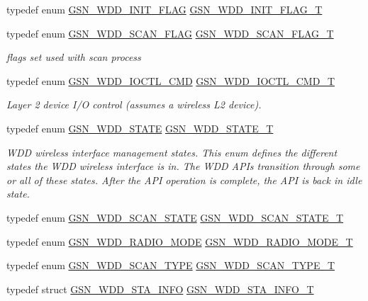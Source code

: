 \begin{DoxyCompactItemize}
typedef enum \hyperlink{a00603_a4ba2b4079f3dd37aa77afda4013afc79}{GSN\_\-WDD\_\-INIT\_\-FLAG} \hyperlink{a00603_ae0e55b26e7cfed5cc849b360e24289e3}{GSN\_\-WDD\_\-INIT\_\-FLAG\_\-T}
\item 
typedef enum \hyperlink{a00677_gaa5a68f88cc724016ff0334f21c0dd120}{GSN\_\-WDD\_\-SCAN\_\-FLAG} \hyperlink{a00677_gad988da580b33f4a18de188de56a05736}{GSN\_\-WDD\_\-SCAN\_\-FLAG\_\-T}
\begin{DoxyCompactList}\small\item\em flags set used with scan process \end{DoxyCompactList}\item 
typedef enum \hyperlink{a00670_gaf67ac3e77c7a5742b9b0bc7672529533}{GSN\_\-WDD\_\-IOCTL\_\-CMD} \hyperlink{a00670_ga0c5055a50e14741ff0accb7d8d5bf039}{GSN\_\-WDD\_\-IOCTL\_\-CMD\_\-T}
\begin{DoxyCompactList}\small\item\em Layer 2 device I/O control (assumes a wireless L2 device). \end{DoxyCompactList}\item 
typedef enum \hyperlink{a00677_ga235b17af49bd1a1dc55715a7809b24ff}{GSN\_\-WDD\_\-STATE} \hyperlink{a00677_ga3a801c5847114c1bb6dc9cc1a0c5837e}{GSN\_\-WDD\_\-STATE\_\-T}
\begin{DoxyCompactList}\small\item\em WDD wireless interface management states. This enum defines the different states the WDD wireless interface is in. The WDD APIs transition through some or all of these states. After the API operation is complete, the API is back in idle state. \end{DoxyCompactList}\item 
typedef enum \hyperlink{a00603_a7504de238040fb5947d3c3ef6fca9ae9}{GSN\_\-WDD\_\-SCAN\_\-STATE} \hyperlink{a00603_a940af0328a2568d0750d618f5c8f141e}{GSN\_\-WDD\_\-SCAN\_\-STATE\_\-T}
\item 
typedef enum \hyperlink{a00603_a141edfb4eec2f7e9831a65c822756f64}{GSN\_\-WDD\_\-RADIO\_\-MODE} \hyperlink{a00603_a66d764097f36dbea8341b9591e8dc9cf}{GSN\_\-WDD\_\-RADIO\_\-MODE\_\-T}
\item 
typedef enum \hyperlink{a00603_a8d2389f013d584eba4f8f16644b2e20e}{GSN\_\-WDD\_\-SCAN\_\-TYPE} \hyperlink{a00603_a466b998274f9dcd29e5e82e2f28904b9}{GSN\_\-WDD\_\-SCAN\_\-TYPE\_\-T}
\item 
typedef struct \hyperlink{a00299}{GSN\_\-WDD\_\-STA\_\-INFO} \hyperlink{a00603_affc6d455eb246fbebdf2993828a937ed}{GSN\_\-WDD\_\-STA\_\-INFO\_\-T}

\end{DoxyCompactItemize}

